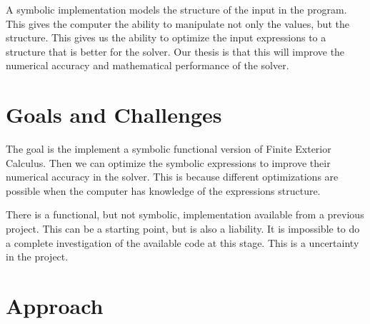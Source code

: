 \documentclass{scrartcl}
\begin{document}
A symbolic implementation models the structure of the input in the program.
This gives the computer the ability to manipulate not only the values, but the
structure. This gives us the ability to optimize the input expressions to
a structure that is better for the solver. Our thesis is that this will improve
the numerical accuracy and mathematical performance of the solver.




\section{Goals and Challenges}

The goal is the implement a symbolic functional version of Finite Exterior
Calculus.  Then we can optimize the symbolic expressions to improve their
numerical accuracy in the solver. This is because different optimizations are
possible when the computer has knowledge of the expressions structure.




There is a functional, but not symbolic, implementation available from
a previous project. This can be a starting point, but is also a liability.
It is impossible to do a complete investigation of the available code at this stage.  This is a uncertainty in the project.


\section{Approach}

\end{document}
